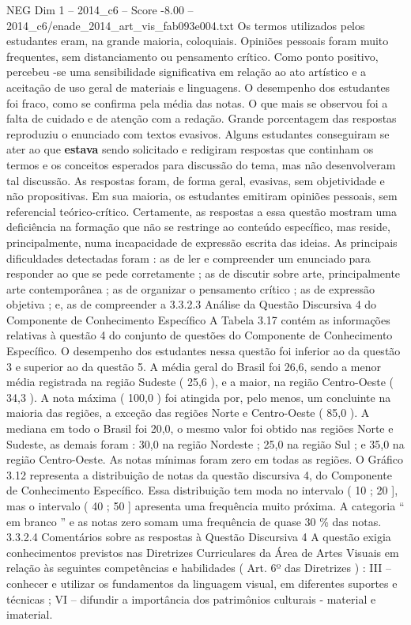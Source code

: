 \begin{textsample}{NEG Dim 1 – 2014\_c6 – Score -8.00 – 2014\_c6/enade\_2014\_art\_vis\_fab093e004.txt}
Os termos utilizados pelos estudantes eram, na grande maioria, coloquiais.
Opiniões pessoais foram muito frequentes, sem distanciamento ou pensamento crítico.
Como ponto positivo, percebeu -se uma sensibilidade significativa em relação ao ato artístico e a aceitação de uso geral de materiais e linguagens.
O desempenho dos estudantes foi fraco, como se confirma pela média das notas.
O que mais se observou foi a falta de cuidado e de atenção com a redação.
Grande porcentagem das respostas reproduziu o enunciado com textos evasivos.
Alguns estudantes conseguiram se ater ao que \textbf{estava} sendo solicitado e redigiram respostas que continham os termos e os conceitos esperados para discussão do tema, mas não desenvolveram tal discussão.
As respostas foram, de forma geral, evasivas, sem objetividade e não propositivas.
Em sua maioria, os estudantes emitiram opiniões pessoais, sem referencial teórico-crítico.
Certamente, as respostas a essa questão mostram uma deficiência na formação que não se restringe ao conteúdo específico, mas reside, principalmente, numa incapacidade de expressão escrita das ideias.
As principais dificuldades detectadas foram : as de ler e compreender um enunciado para responder ao que se pede corretamente ; as de discutir sobre arte, principalmente arte contemporânea ; as de organizar o pensamento crítico ; as de expressão objetiva ; e, as de compreender a 3.3.2.3 Análise da Questão Discursiva 4 do Componente de Conhecimento Específico A Tabela 3.17 contém as informações relativas à questão 4 do conjunto de questões do Componente de Conhecimento Específico.
O desempenho dos estudantes nessa questão foi inferior ao da questão 3 e superior ao da questão 5.
A média geral do Brasil foi 26,6, sendo a menor média registrada na região Sudeste ( 25,6 ), e a maior, na região Centro-Oeste ( 34,3 ).
A nota máxima ( 100,0 ) foi atingida por, pelo menos, um concluinte na maioria das regiões, a exceção das regiões Norte e Centro-Oeste ( 85,0 ).
A mediana em todo o Brasil foi 20,0, o mesmo valor foi obtido nas regiões Norte e Sudeste, as demais foram : 30,0 na região Nordeste ; 25,0 na região Sul ; e 35,0 na região Centro-Oeste.
As notas mínimas foram zero em todas as regiões.
O Gráfico 3.12 representa a distribuição de notas da questão discursiva 4, do Componente de Conhecimento Específico.
Essa distribuição tem moda no intervalo ( 10 ; 20 ], mas o intervalo ( 40 ; 50 ] apresenta uma frequência muito próxima.
A categoria “ em branco ” e as notas zero somam uma frequência de quase 30 \% das notas. 3.3.2.4 Comentários sobre as respostas à Questão Discursiva 4 A questão exigia conhecimentos previstos nas Diretrizes Curriculares da Área de Artes Visuais em relação às seguintes competências e habilidades ( Art. 6º das Diretrizes ) : III – conhecer e utilizar os fundamentos da linguagem visual, em diferentes suportes e técnicas ; VI – difundir a importância dos patrimônios culturais - material e imaterial.

\end{textsample}
